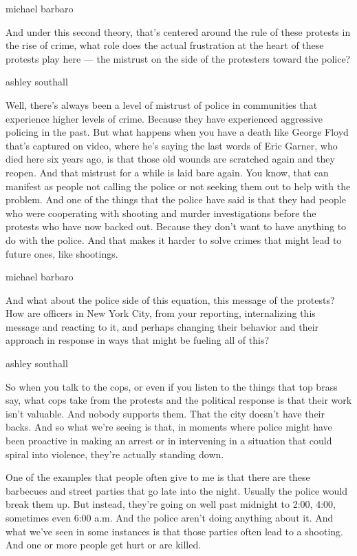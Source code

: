 michael barbaro

And under this second theory, that's centered around the rule of these
protests in the rise of crime, what role does the actual frustration at
the heart of these protests play here --- the mistrust on the side of
the protesters toward the police?

ashley southall

Well, there's always been a level of mistrust of police in communities
that experience higher levels of crime. Because they have experienced
aggressive policing in the past. But what happens when you have a death
like George Floyd that's captured on video, where he's saying the last
words of Eric Garner, who died here six years ago, is that those old
wounds are scratched again and they reopen. And that mistrust for a
while is laid bare again. You know, that can manifest as people not
calling the police or not seeking them out to help with the problem. And
one of the things that the police have said is that they had people who
were cooperating with shooting and murder investigations before the
protests who have now backed out. Because they don't want to have
anything to do with the police. And that makes it harder to solve crimes
that might lead to future ones, like shootings.

michael barbaro

And what about the police side of this equation, this message of the
protests? How are officers in New York City, from your reporting,
internalizing this message and reacting to it, and perhaps changing
their behavior and their approach in response in ways that might be
fueling all of this?

ashley southall

So when you talk to the cops, or even if you listen to the things that
top brass say, what cops take from the protests and the political
response is that their work isn't valuable. And nobody supports them.
That the city doesn't have their backs. And so what we're seeing is
that, in moments where police might have been proactive in making an
arrest or in intervening in a situation that could spiral into violence,
they're actually standing down.

One of the examples that people often give to me is that there are these
barbecues and street parties that go late into the night. Usually the
police would break them up. But instead, they're going on well past
midnight to 2:00, 4:00, sometimes even 6:00 a.m. And the police aren't
doing anything about it. And what we've seen in some instances is that
those parties often lead to a shooting. And one or more people get hurt
or are killed.

